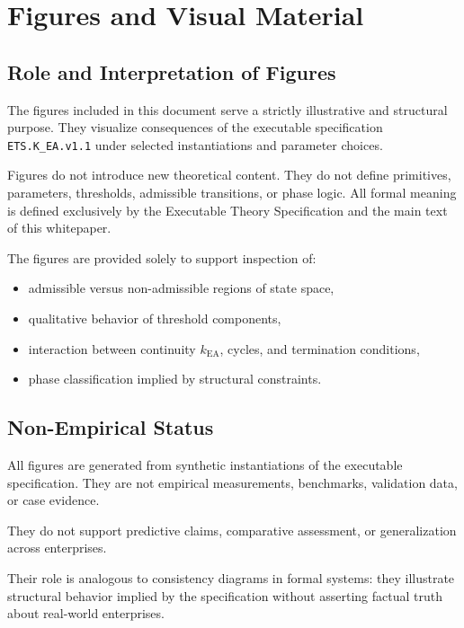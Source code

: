 
\section*{Figures and Visual Material}

\subsection*{Role and Interpretation of Figures}

The figures included in this document serve a strictly illustrative and
structural purpose.
They visualize consequences of the executable specification
\texttt{ETS.K\_EA.v1.1} under selected instantiations and parameter
choices.

Figures do not introduce new theoretical content.
They do not define primitives, parameters, thresholds, admissible
transitions, or phase logic.
All formal meaning is defined exclusively by the Executable Theory
Specification and the main text of this whitepaper.

The figures are provided solely to support inspection of:
\begin{itemize}
  \item admissible versus non-admissible regions of state space,
  \item qualitative behavior of threshold components,
  \item interaction between continuity $k_{\mathrm{EA}}$, cycles, and
        termination conditions,
  \item phase classification implied by structural constraints.
\end{itemize}

\subsection*{Non-Empirical Status}

All figures are generated from synthetic instantiations of the
executable specification.
They are not empirical measurements, benchmarks, validation data, or
case evidence.

They do not support predictive claims, comparative assessment, or
generalization across enterprises.

Their role is analogous to consistency diagrams in formal systems: they
illustrate structural behavior implied by the specification without
asserting factual truth about real-world enterprises.

